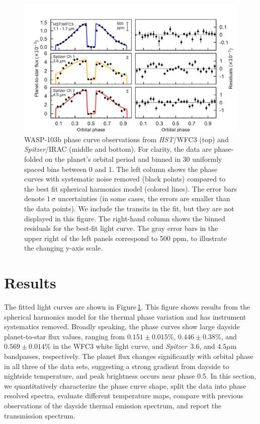 \documentclass[twocolumn, trackchanges]{aastex61}
\newcommand{\project}[1]{\textsl{#1}}
\newcommand{\HST}{\project{HST}}
\newcommand{\Spitzer}{\project{Spitzer}}
\begin{document}
\begin{figure}
\includegraphics[width = 1.0\textwidth]{fig5.pdf}
\caption{WASP-103b phase curve observations from \HST/WFC3 (top) and \Spitzer/IRAC (middle and bottom). For clarity, the data are phase-folded on the planet's orbital period and binned in 30 uniformly spaced bins between 0 and 1. The left column shows the phase curves with systematic noise removed (black points) compared to the best fit spherical harmonics model (colored lines). The error bars denote $1\,\sigma$ uncertainties (in some cases, the errors are smaller than the data points).  We include the transits in the fit, but they are not displayed in this figure. The right-hand column shows the binned residuals for the best-fit light curve. The gray error bars in the upper right of the left panels correspond to 500 ppm, to illustrate the changing y-axis scale.}
\label{fig:phasecurves}
\end{figure}

\section{Results}
\label{sec:results}
The fitted light curves are shown in Figure\,\ref{fig:phasecurves}. This figure shows results from the spherical harmonics model for the thermal phase variation and has instrument systematics removed.  Broadly speaking, the phase curves show large dayside planet-to-star flux values, ranging from $0.151\pm0.015\%$, $0.446\pm0.38\%$, and $0.569\pm0.014\%$ in the WFC3 white light curve, and \Spitzer\ $3.6$, and $4.5\mu$m bandpasses, respectively.  The planet flux changes significantly with orbital phase in all three of the data sets, suggesting a strong gradient from dayside to nightside temperature, and peak brightness occurs near phase 0.5. In this section, we quantitatively characterize the phase curve shape, split the data into phase resolved spectra, evaluate different temperature maps, compare with previous observations of the dayside thermal emission spectrum, and report the transmission spectrum.
\end{document}
